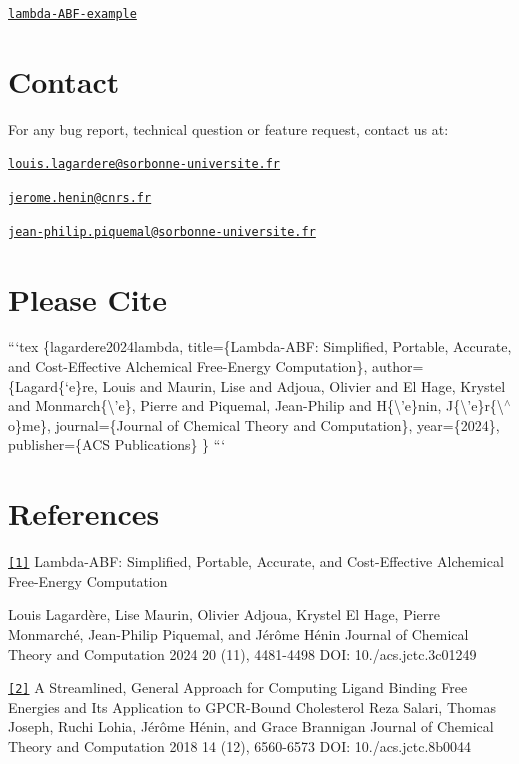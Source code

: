 \href{https://github.com/TinkerTools/tinker-hp/tree/master/v1.2/tutorials/lambda-ABF-example.tar.gz}{\tt lambda-\/\-A\-B\-F-\/example}

\section*{Contact}

For any bug report, technical question or feature request, contact us at\-:
\begin{DoxyItemize}
\item \href{mailto:louis.lagardere@sorbonne-universite.fr}{\tt louis.\-lagardere@sorbonne-\/universite.\-fr}
\item \href{mailto:jerome.henin@cnrs.fr}{\tt jerome.\-henin@cnrs.\-fr}
\item \href{mailto:jean-philip.piquemal@sorbonne-universite.fr}{\tt jean-\/philip.\-piquemal@sorbonne-\/universite.\-fr}
\end{DoxyItemize}

\section*{Please Cite}

```tex \{lagardere2024lambda, title=\{Lambda-\/\-A\-B\-F\-: Simplified, Portable, Accurate, and Cost-\/\-Effective Alchemical Free-\/\-Energy Computation\}, author=\{Lagard\{`e\}re, Louis and Maurin, Lise and Adjoua, Olivier and El Hage, Krystel and Monmarch\{\textbackslash{}'e\}, Pierre and Piquemal, Jean-\/\-Philip and H\{\textbackslash{}'e\}nin, J\{\textbackslash{}'e\}r\{\textbackslash{}$^\wedge$o\}me\}, journal=\{Journal of Chemical Theory and Computation\}, year=\{2024\}, publisher=\{A\-C\-S Publications\} \} ```

\section*{References}

\href{https://doi.org/10.1021/acs.jctc.3c01249}{\tt \mbox{[}1\mbox{]}} Lambda-\/\-A\-B\-F\-: Simplified, Portable, Accurate, and Cost-\/\-Effective Alchemical Free-\/\-Energy Computation

Louis Lagardère, Lise Maurin, Olivier Adjoua, Krystel El Hage, Pierre Monmarché, Jean-\/\-Philip Piquemal, and Jérôme Hénin Journal of Chemical Theory and Computation 2024 20 (11), 4481-\/4498 D\-O\-I\-: 10./acs.jctc.\-3c01249

\href{https://doi.org/10.1021/acs.jctc.8b00447}{\tt \mbox{[}2\mbox{]}} A Streamlined, General Approach for Computing Ligand Binding Free Energies and Its Application to G\-P\-C\-R-\/\-Bound Cholesterol Reza Salari, Thomas Joseph, Ruchi Lohia, Jérôme Hénin, and Grace Brannigan Journal of Chemical Theory and Computation 2018 14 (12), 6560-\/6573 D\-O\-I\-: 10./acs.jctc.\-8b0044

